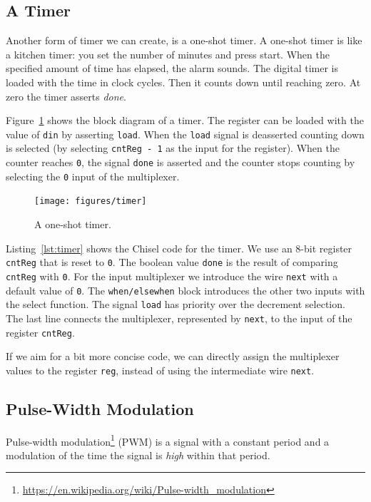 \documentclass[%
    10pt,
    headinclude, footexclude,
    openright, %
    notitlepage,
    cleardoubleempty,
    headsepline,
    pointlessnumbers,
    bibtotoc, idxtotoc,
    ]{scrbook}
\newcommand{\code}[1]{{\lstinline[basicstyle=\small\ttfamily]{#1}}}
\newcommand{\myref}[2]{\href{#1}{#2}}
\renewcommand{\myref}[2]{{#2}{\footnote{\url{#1}}}}
\begin{document}
\subsection{A Timer}

Another form of timer we can create, is a one-shot timer. A one-shot timer is like a
kitchen timer: you set the number of minutes and press start. When the specified amount
of time has elapsed, the alarm sounds.
The digital timer is loaded with the time in clock cycles.
Then it counts down until reaching zero. At zero the timer asserts \emph{done}.

Figure~\ref{fig:timer} shows the block diagram of a timer. The register can be loaded with
the value of \code{din} by asserting \code{load}. When the \code{load} signal is deasserted
counting down is selected (by selecting \code{cntReg - 1} as the input for the register).
When the counter reaches \code{0}, the signal \code{done} is asserted and the counter stops
counting by selecting the \code{0} input of the multiplexer.

\begin{figure}
  \centering
  \texttt{[image: figures/timer]}
  \caption{A one-shot timer.}
  \label{fig:timer}
\end{figure}

Listing~\ref{lst:timer} shows the Chisel code for the timer. We use an 8-bit register \code{cntReg}
that is reset to \code{0}. The boolean value \code{done} is the result of comparing \code{cntReg}
with \code{0}. For the input multiplexer we introduce the wire \code{next} with a default
value of \code{0}. The \code{when/elsewhen} block introduces the other two inputs with
the select function. The signal \code{load} has priority over the decrement selection.
The last line connects the multiplexer, represented by \code{next}, to the input of the
register \code{cntReg}.


If we aim for a bit more concise code, we can directly assign the multiplexer values to
the register \code{reg}, instead of using the intermediate wire \code{next}.

\subsection{Pulse-Width Modulation}

\myref{https://en.wikipedia.org/wiki/Pulse-width_modulation}{Pulse-width modulation} (PWM)
is a signal with a constant period and a modulation of the time the signal is \emph{high}
within that period.
\end{document}
